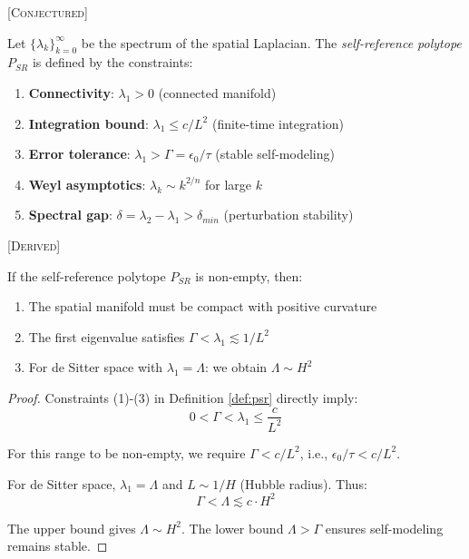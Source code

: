 \begin{definition} \label{def:psr}
\textsc{[Conjectured]}

Let $\{\lambda_k\}_{k=0}^{\infty}$ be the spectrum of the spatial Laplacian. The \emph{self-reference polytope} $P_{SR}$ is defined by the constraints:
\begin{enumerate}
    \item \textbf{Connectivity}: $\lambda_1 > 0$ (connected manifold)
    \item \textbf{Integration bound}: $\lambda_1 \leq c/L^2$ (finite-time integration)
    \item \textbf{Error tolerance}: $\lambda_1 > \Gamma = \epsilon_0/\tau$ (stable self-modeling)
    \item \textbf{Weyl asymptotics}: $\lambda_k \sim k^{2/n}$ for large $k$
    \item \textbf{Spectral gap}: $\delta = \lambda_2 - \lambda_1 > \delta_{min}$ (perturbation stability)
\end{enumerate}
\end{definition}

\begin{theorem}
\textsc{[Derived]}

If the self-reference polytope $P_{SR}$ is non-empty, then:
\begin{enumerate}
    \item The spatial manifold must be compact with positive curvature
    \item The first eigenvalue satisfies $\Gamma < \lambda_1 \lesssim 1/L^2$
    \item For de Sitter space with $\lambda_1 = \Lambda$: we obtain $\Lambda \sim H^2$
\end{enumerate}
\end{theorem}

\begin{proof}
Constraints (1)-(3) in Definition \ref{def:psr} directly imply:
\[
0 < \Gamma < \lambda_1 \leq \frac{c}{L^2}
\]

For this range to be non-empty, we require $\Gamma < c/L^2$, i.e., $\epsilon_0/\tau < c/L^2$.

For de Sitter space, $\lambda_1 = \Lambda$ and $L \sim 1/H$ (Hubble radius). Thus:
\[
\Gamma < \Lambda \lesssim c \cdot H^2
\]

The upper bound gives $\Lambda \sim H^2$. The lower bound $\Lambda > \Gamma$ ensures self-modeling remains stable.
\end{proof}

